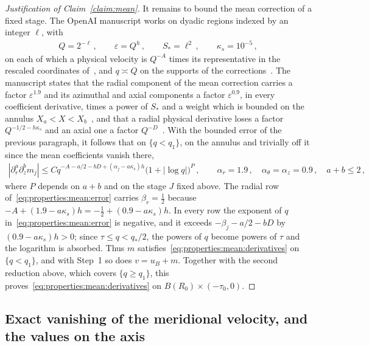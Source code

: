 \documentclass[11pt,reqno]{amsproc}
\numberwithin{equation}{section}
\theoremstyle{remark}
\newcommand{\p}{\partial}
\newcommand{\abs}[1]{\left|#1\right|}
\newcommand{\eps}{\varepsilon}
\begin{document}
\begin{proof}[Justification of Claim~\ref{claim:mean}]
It remains to bound the mean correction of a fixed stage. The OpenAI manuscript works on dyadic regions indexed by an integer $\ell$, with
\begin{align*}
Q=2^{-\ell}
\,,\qquad
\eps=Q^h
\,,\qquad
S_*=\ell^2
\,,\qquad
\kappa_s=10^{-5}
\,,
\end{align*}
on each of which a physical velocity is $Q^{-A}$ times its representative in the rescaled coordinates of~\cite[equation~(6.1), p.~62, and the text following it and equation~(6.2), p.~63]{OpenAIManuscript}, and $q\asymp Q$ on the supports of the corrections~\cite[pp.~62 and~113]{OpenAIManuscript}. The manuscript states that the radial component of the mean correction carries a factor $\eps^{1.9}$ and its azimuthal and axial components a factor $\eps^{0.9}$, in every coefficient derivative, times a power of $S_*$ and a weight which is bounded on the annulus $X_a<X<X_b$~\cite[equation~(9.9), p.~106, with Definition~6.4 and equations~(6.23)--(6.24), p.~69]{OpenAIManuscript}, and that a radial physical derivative loses a factor $Q^{-1/2-h\kappa_s}$ and an axial one a factor $Q^{-D}$~\cite[equation~(9.19), p.~113]{OpenAIManuscript}. With the bounded error of the previous paragraph, it follows that on $\{q<q_1\}$, on the annulus and trivially off it since the mean coefficients vanish there,
\begin{align}
\abs{\p_r^a\p_z^bm_j}
\le Cq^{-A-a/2-bD+(\alpha_j-a\kappa_s)h}\bigl(1+\abs{\log q}\bigr)^{P}
\,,\qquad
\alpha_r=1.9
\,,\quad
\alpha_\theta=\alpha_z=0.9
\,,\quad
a+b\le2
\,,
\label{eq:properties:mean:error}
\end{align}
where $P$ depends on $a+b$ and on the stage $J$ fixed above. The radial row of~\eqref{eq:properties:mean:error} carries $\beta_r=\frac12$ because $-A+(1.9-a\kappa_s)h=-\frac12+(0.9-a\kappa_s)h$. In every row the exponent of $q$ in~\eqref{eq:properties:mean:error} is negative, and it exceeds $-\beta_j-a/2-bD$ by $(0.9-a\kappa_s)h>0$; since $\tau\le q<q_*/2$, the powers of $q$ become powers of $\tau$ and the logarithm is absorbed. Thus $m$ satisfies~\eqref{eq:properties:mean:derivatives} on $\{q<q_1\}$, and with Step~1 so does $v=u_B+m$. Together with the second reduction above, which covers $\{q\ge q_1\}$, this proves~\eqref{eq:properties:mean:derivatives} on $B(R_0)\times(-\tau_0,0)$.
\end{proof}

\subsection{Exact vanishing of the meridional velocity, and the values on the axis}
\label{sec:exterior:source}
\end{document}

